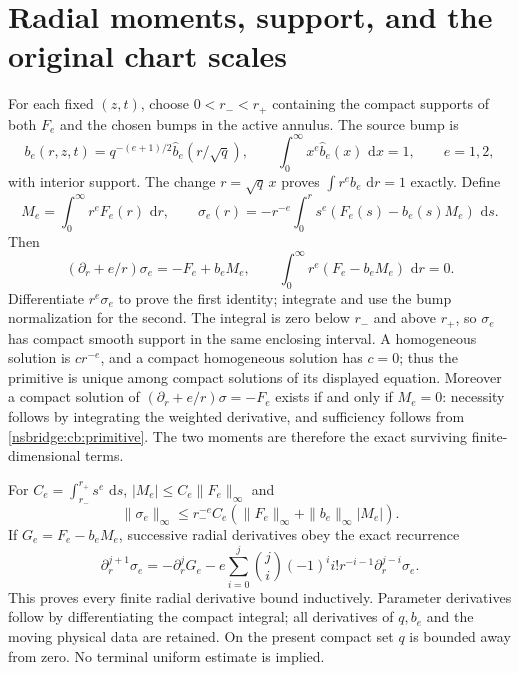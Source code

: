 \documentclass[11pt]{article}
\newcommand{\dd}{\,\mathrm d}
\begin{document}
\section{Radial moments, support, and the original chart scales}
For each fixed $(z,t)$, choose $0<r_-<r_+$ containing the compact
supports of both $F_e$ and the chosen bumps in the active annulus.
The source bump is
\[
 b_e(r,z,t)=q^{-(e+1)/2}\widehat b_e(r/\sqrt q),\qquad
 \int_0^\infty x^e\widehat b_e(x)\,\dd x=1,\qquad e=1,2,
\]
with interior support. The change $r=\sqrt q\,x$ proves
$\int r^eb_e\,\dd r=1$ exactly. Define
\begin{equation}
 M_e=\int_0^\infty r^eF_e(r)\,\dd r,\qquad
 \sigma_e(r)=-r^{-e}\int_0^r s^e(F_e(s)-b_e(s)M_e)\,\dd s .
 \label{nsbridge:cb:primitive}
\end{equation}
Then
\begin{equation}
 (\partial_r+e/r)\sigma_e=-F_e+b_eM_e,\qquad
 \int_0^\infty r^e(F_e-b_eM_e)\,\dd r=0. \label{nsbridge:cb:radial}
\end{equation}
Differentiate $r^e\sigma_e$ to prove the first identity; integrate and
use the bump normalization for the second. The integral is zero below
$r_-$ and above $r_+$, so $\sigma_e$ has compact smooth support in the
same enclosing interval. A homogeneous solution is $cr^{-e}$, and a
compact homogeneous solution has $c=0$; thus the primitive is unique
among compact solutions of its displayed equation. Moreover a compact
solution of $(\partial_r+e/r)\sigma=-F_e$ exists if and only if $M_e=0$:
necessity follows by integrating the weighted derivative, and
sufficiency follows from \eqref{nsbridge:cb:primitive}. The two moments are
therefore the exact surviving finite-dimensional terms.

For $C_e=\int_{r_-}^{r_+}s^e\,\dd s$,
$|M_e|\le C_e\|F_e\|_\infty$ and
\[
 \|\sigma_e\|_\infty\le r_-^{-e}C_e
        (\|F_e\|_\infty+\|b_e\|_\infty|M_e|).
\]
If $G_e=F_e-b_eM_e$, successive radial derivatives obey the exact recurrence
\[
 \partial_r^{j+1}\sigma_e=-\partial_r^jG_e
 -e\sum_{i=0}^j \binom{j}{i}(-1)^ii!r^{-i-1}
                              \partial_r^{j-i}\sigma_e .
\]
This proves every finite radial derivative bound inductively. Parameter
derivatives follow by differentiating the compact integral; all derivatives
of $q,b_e$ and the moving physical data are retained. On the present compact
set $q$ is bounded away from zero. No terminal uniform estimate is implied.
\end{document}
